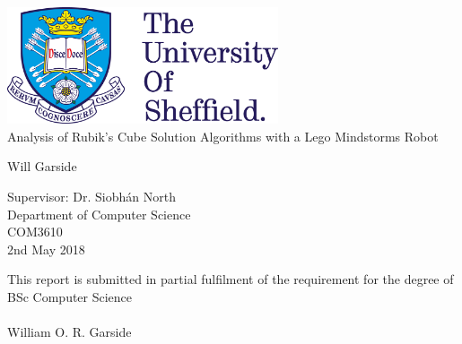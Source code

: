 \begin{titlepage}
	{
		
	    \centering
	   	\vspace*{\fill}
	   	
		\includegraphics[width=0.6\textwidth]{Resources/Images/imgTUosLogo.png} \\
	   	\vspace{1.5cm}
	    {\Huge Analysis of Rubik's Cube Solution Algorithms with a Lego Mindstorms Robot} 
	    
		\vspace{1.5cm}
	    
	    {\huge Will Garside}
	    \vspace{2cm}
	    
	    {\Large Supervisor: Dr. Siobh\'{a}n North} \\
	    {\Large Department of Computer Science} \\
	    {\Large COM3610} \\
	    {\Large 2nd May 2018} 
	    
	    \vspace{0.8cm}
	    
		{\Large This report is submitted in partial fulfilment of the requirement for the degree of BSc Computer Science} \\
		{\Large {}} \\
		{\Large William O. R. Garside} \\
	
	    \vspace*{\fill}
	}
\end{titlepage}